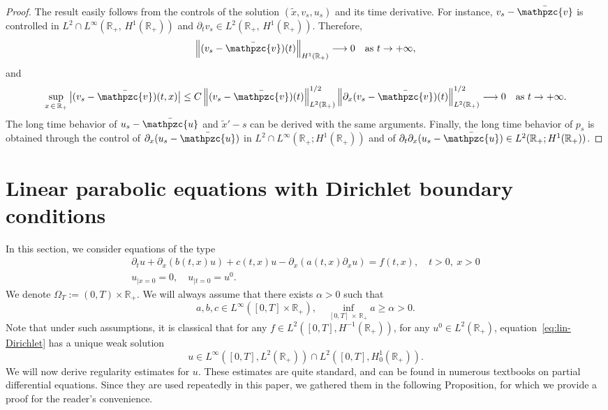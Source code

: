 \documentclass[AHL,Unicode,longabstracts,published]{cedram}
\newcommand{\R}{\mathbb{R}}
\newcommand{\p}{\partial}
\newcommand{\bv}{\bar{\mathpzc{v}}}
\newcommand{\bu}{\bar{\mathpzc{u}}}
\newcommand{\tx}{\widetilde{x}}
\newcommand{\tx}{\widetilde{x}}
\begin{document}
\begin{proof}
The result easily follows from the controls of the solution $(\tx,v_s,u_s)$ and its time derivative. For instance, $v_s -\bv$ is controlled in $L^2 \cap L^\infty(\R_+,\, H^1(\R_+))$ and $\partial_t v_s \in L^2(\R_+,\, H^1(\R_+))$. Therefore,
\[
\left\|(v_s -\bv)(t)\right\|_{H^1(\R_+)} \longrightarrow 0 \quad \text{as}~t\to +\infty,
\]
and
\[
\sup_{x\,\in\,\R_+}\big| (v_s -\bv)(t,x) \big| \leq C \left\|(v_s -\bv)(t) \right\|_{L^2(\R_+)}^{1/2} \left\|\partial_x (v_s -\bv)(t) \right\|_{L^2(\R_+)}^{1/2} \longrightarrow 0 \quad \text{as}~t\to +\infty.
\]
The long time behavior of $u_s-\bu$ and $\tx' -s$ can be derived with the same arguments. Finally, the long time behavior of $p_s$ is obtained through the control of $\partial_x(u_s -\bu)$ in $L^2 \cap L^\infty(\R_+; H^1(\R_+))$ and of $\partial_t \partial_x(u_s -\bu) \in L^2(\R_+; H^1(\R_+))$.
\end{proof}



\appendix

\section{Linear parabolic equations with Dirichlet boundary conditions}

In this section, we consider equations of the type
\begin{equation}\label{eq:lin-Dirichlet}
\begin{aligned}
\p_t u +\p_x(b(t,x) u)+ c(t,x) u -\p_{x}(a(t,x) \p_x u)=f(t,x),\quad t>0, \ x>0\\
u_{|x=0}=0,\quad u_{|t=0}=u^0.
\end{aligned}
\end{equation} We denote $\Omega_T:=(0,T)\times \R_+$. We will always assume that there exists $\alpha>0$ such that
\begin{equation}\label{hyp:minimales-coeffs}
a,b,c\in L^\infty([0,T]\times \R_+),\quad \inf_{[0,T]\,\times\,\R_+} a\geq \alpha>0.
\end{equation}
Note that under such assumptions, it is classical that for any $f\in L^2([0,T], H^{-1}(\R_+))$, for any $u^0\in L^2(\R_+)$, equation~\eqref{eq:lin-Dirichlet} has a unique weak solution
\[
u\in L^\infty\left([0,T], L^2(\R_+)\right)\cap L^2\left([0,T], H^1_0(\R_+)\right).
\]
We will now derive regularity estimates for $u$. These estimates are quite standard, and can be found in numerous textbooks on partial differential equations. Since they are used repeatedly in this paper, we gathered them in the following Proposition, for which we provide a proof for the reader's convenience.
\end{document}
